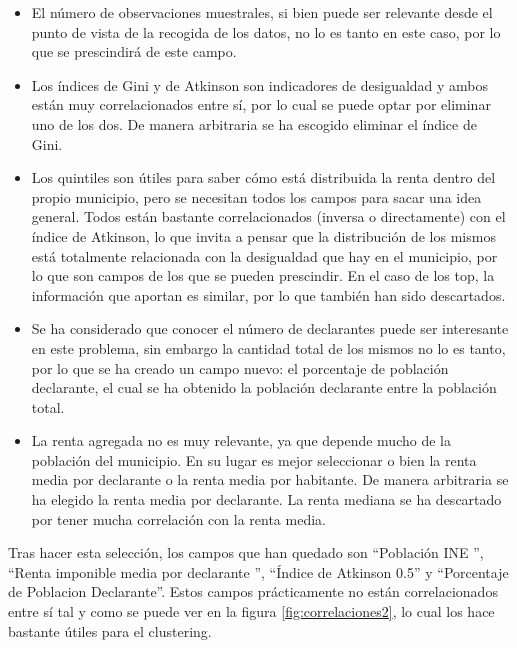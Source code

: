 \documentclass[acmtog, screen]{acmart}
\begin{document}
\begin{itemize}
	\item El número de observaciones muestrales, si bien puede ser relevante desde el punto de vista de la recogida de los datos, no lo es tanto en este caso, por lo que se prescindirá de este campo.
	\item Los índices de Gini y de Atkinson son indicadores de desigualdad y ambos están muy correlacionados entre sí, por lo cual se puede optar por eliminar uno de los dos. De manera arbitraria se ha escogido eliminar el índice de Gini.
	\item Los quintiles son útiles para saber cómo está distribuida la renta dentro del propio municipio, pero se necesitan todos los campos para sacar una idea general. Todos están bastante correlacionados (inversa o directamente) con el índice de Atkinson, lo que invita a pensar que la distribución de los mismos está totalmente relacionada con la desigualdad que hay en el municipio, por lo que son campos de los que se pueden prescindir. En el caso de los top, la información que aportan es similar, por lo que también han sido descartados.
	\item Se ha considerado que conocer el número de declarantes puede ser interesante en este problema, sin embargo la cantidad total de los mismos no lo es tanto, por lo que se ha creado un campo nuevo: el porcentaje de población declarante, el cual se ha obtenido la población declarante entre la población total.
	\item La renta agregada no es muy relevante, ya que depende mucho de la población del municipio. En su lugar es mejor seleccionar o bien la renta media por declarante o la renta media por habitante. De manera arbitraria se ha elegido la renta media por declarante. La renta mediana se ha descartado por tener mucha correlación con la renta media.
\end{itemize}

Tras hacer esta selección, los campos que han quedado son ``Población INE '', ``Renta imponible media por declarante '', ``Índice de Atkinson 0.5'' y ``Porcentaje de Poblacion Declarante''. Estos campos prácticamente no están correlacionados entre sí tal y como se puede ver en la figura \ref{fig:correlaciones2}, lo cual los hace bastante útiles para el clustering.
\end{document}
